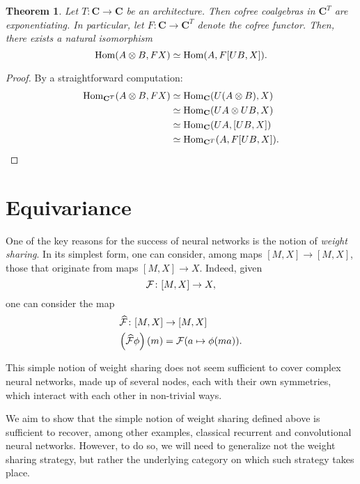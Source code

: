 \documentclass[12pt]{article}
\newtheorem{theorem}{Theorem}
\newcommand{\Hom}{{\textnormal{Hom}}}
\newcommand{\Cat}{{\mathbf{C}}}
\begin{document}
\begin{theorem}\label{thm:cofree_exponentiating}
    Let $T\colon \Cat \rightarrow \Cat$ be an architecture. Then cofree coalgebras in $\Cat^T$ are exponentiating. In particular, let $F\colon \Cat \rightarrow \Cat^T$ denote the cofree functor. Then, there exists a natural isomorphism
    \begin{equation*}
        \Hom(A\otimes B, FX) \simeq \Hom(A, F[UB, X]).
    \end{equation*}
\end{theorem}

\begin{proof}
    By a straightforward computation:
    \begin{align*}
        \Hom_{\Cat^T}(A\otimes B, FX)
        &\simeq \Hom_{\Cat}(U(A \otimes B), X)\\
        &\simeq \Hom_{\Cat}(UA \otimes UB, X)\\
        &\simeq \Hom_{\Cat}(UA, [UB, X])\\
        &\simeq \Hom_{\Cat^T}(A, F[UB, X]).
    \end{align*}
\end{proof}

\section{Equivariance}

One of the key reasons for the success of neural networks is the notion of {\em weight sharing}. In its simplest form, one can consider, among maps $[M, X] \rightarrow [M, X]$, those that originate from maps $[M, X] \rightarrow X$. Indeed, given
\begin{equation*}
    {\cal F} \colon [M, X] \rightarrow X,
\end{equation*}
one can consider the map
\begin{align*}
    \widehat{\cal F} \colon [M, X] &\rightarrow [M, X] \\
    \left(\widehat{\cal F}\phi\right)(m) &= {\cal F}(a \mapsto \phi(ma)).
\end{align*}

This simple notion of weight sharing does not seem sufficient to cover complex neural networks, made up of several nodes, each with their own symmetries, which interact with each other in non-trivial ways.

We aim to show that the simple notion of weight sharing defined above is sufficient to recover, among other examples, classical recurrent and convolutional neural networks. However, to do so, we will need to generalize not the weight sharing strategy, but rather the underlying category on which such strategy takes place.
\end{document}
